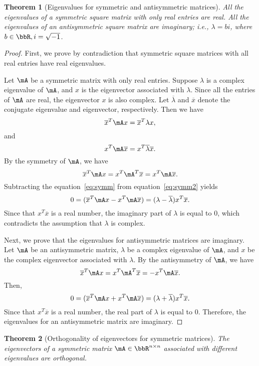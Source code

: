 \documentclass[11pt]{article}
\theoremstyle{plain}
\newtheorem{thm}{Theorem}[section]
\theoremstyle{definition}
\begin{document}
\begin{thm}[Eigenvalues for symmetric and antisymmetric matrices]\label{thm:symmeign}
All the eigenvalues of a symmetric square matrix with only real entries are real. All the eigenvalues of an antisymmetric square matrix are imaginary; i.e., $\lambda = b i$, where $b \in \bbR, i = \sqrt{-1}$.
\end{thm}
\begin{proof}
	First, we prove by contradiction that symmetric square matrices with all real entries have real eigenvalues. 
	
	Let  $\mA$  be a symmetric  matrix with only real entries. Suppose $\lambda$  is a complex eigenvalue of $\mA$, and $x$ is the eigenvector associated with $\lambda$. Since all the entries of $\mA$ are real, the eigenvector $x$ is also complex. Let $\overline \lambda$ and $\overline x$ denote the conjugate eigenvalue and eigenvector, respectively. Then we have
	\begin{equation}\label{eq:symm}
		\overline x^T \mA x = \overline x^T \lambda x,
	\end{equation} 
	and
	\begin{equation}\label{eq:symm2}
		x^T \mA \overline x = x^T \overline \lambda \overline x.
	\end{equation}
	 By the symmetry of $\mA$, we have
	\[ \overline x^T \mA x  = x^T \mA^T \overline x = x^T \mA \overline x .\] 
	 Subtracting the equation~\eqref{eq:symm} from equation~\eqref{eq:symm2} yields	\[  0 = ( \overline x^T \mA x -  x^T \mA \overline x ) = (\lambda - \overline \lambda) x^T \overline x.  \]
	Since that $x^T \overline x$ is a real number, the imaginary part of $\lambda$ is equal to 0, which contradicts the assumption that $\lambda$ is complex.
	
	Next, we prove that the eigenvalues for antisymmetric matrices are imaginary. 
	Let $\mA$ be an antisymmetric matrix,  $\lambda$ be a complex eigenvalue of $\mA$, and $x$ be the complex eigenvector associated with $\lambda$. By the antisymmetry of $\mA$, we have
	\[ \overline x^T \mA x  = x^T \mA^T \overline x  =  -x^T \mA \overline x .  \] 
	Then, 
	\[  0 = ( \overline x^T \mA x +  x^T \mA \overline x ) = (\lambda + \overline \lambda) x^T \overline x.   \]
	Since that $x^T \overline x$ is a real number, the real part of $\lambda$ is equal to 0. Therefore, the eigenvalues for an antisymmetric matrix are imaginary.
\end{proof}

\begin{thm}[Orthogonality of eigenvectors for symmetric matrices]\label{thm:symmortho}
The eigenvectors of a symmetric matrix $\mA \in \bbR^{n \times n}$ associated with different eigenvalues are orthogonal.
\end{thm}
\end{document}

